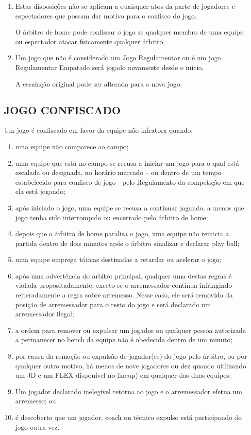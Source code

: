 \begin{enumerate}[label=(\alph*)]
	\item Estas disposições não se aplicam a quaisquer atos da parte de jogadores e espectadores que possam dar motivo para o confisco do jogo.

	O árbitro de \gls{home} pode confiscar o jogo se qualquer membro de uma equipe ou espectador atacar fisicamente qualquer árbitro.
	\item Um jogo que não é considerado um Jogo Regulamentar ou é um jogo Regulamentar Empatado será jogado novamente desde o início.

	A escalação original pode ser alterada para o novo jogo.
\end{enumerate}

\subsection{JOGO CONFISCADO}

Um jogo é confiscado em favor da equipe não infratora quando:
\begin{enumerate}[label=(\alph*)]
	\item uma equipe não comparece ao campo;
	\item  uma equipe que está no campo se recusa a iniciar um jogo para o qual está escalada ou designada, no horário marcado -- ou dentro de um tempo estabelecido para confisco de jogo - pelo Regulamento da competição em que ela está jogando;
	\item  após iniciado o jogo, uma equipe se recusa a continuar jogando, a menos que jogo tenha sido interrompido ou encerrado pelo árbitro de \gls{home};
	\item  depois que o árbitro de \gls{home} paralisa o jogo, uma equipe não reinicia a  partida dentro de dois minutos após o árbitro sinalizar e declarar \gls{play ball};
	\item  uma equipe emprega táticas destinadas a retardar ou acelerar o jogo;
	\item  após uma advertência do árbitro principal, qualquer uma destas regras é violada propositadamente, exceto se o arremessador continua infringindo reiteradamente a regra sobre arremesso. Nesse caso, ele será removido da  posição de arremessador para o resto do jogo e será declarado um arremessador ilegal;
	\item  a ordem para remover ou expulsar um jogador ou qualquer pessoa autorizada  a permanecer no \gls{bench} da equipe não é obedecida dentro de um minuto;
	\item  por causa da remoção ou expulsão de jogador(es) do jogo pelo árbitro, ou por qualquer outro motivo, há menos de nove jogadores ou dez quando utilizando um JD e um FLEX disponível no \gls{lineup}) em qualquer das duas equipes;
	\item  Um jogador declarado inelegível retorna ao jogo e o arremessador efetua um arremesso; ou
	\item  é descoberto que um jogador, \gls{coach} ou técnico expulso está participando do jogo outra vez.
\end{enumerate}

